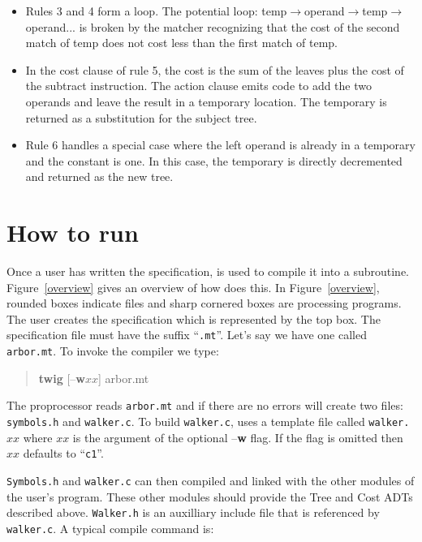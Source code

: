 \begin{itemize}
\item Rules 3 and 4 form a loop.
The potential loop: temp$\to$operand$\to$temp$\to$operand$...$ is
broken
by the matcher recognizing that the cost of the second match of temp
does not cost less than the first match of temp.

\item In the cost clause of rule 5, the cost is the sum of the
leaves plus the cost of the subtract instruction.
The action clause emits code to add the two operands
and leave the result in a temporary location.  The temporary is
returned as a substitution for the subject tree.

\item Rule 6 handles a special case where the left operand is
already in a temporary and the constant is one.  In this case, the
temporary is directly decremented and returned as the new tree.
\end{itemize}

\section{How to run \Twigcomp{}}

Once a user has written the specification, \twigcomp{} is used to compile it
into a subroutine.
Figure~\ref{overview} gives an overview of how \twigcomp{} does this.
In Figure~\ref{overview}, rounded boxes indicate files and sharp
cornered boxes
are processing programs.  The user creates the \twiglang{} specification which
is represented by the top box.  The specification file must have the
suffix ``{\tt .mt}''.  Let's say we have one called {\tt arbor.mt}.
To invoke the \twigcomp{} compiler we type:

\begin{verse}
{\bf twig} [--{\bf w$xx$}] arbor.mt
\end{verse}

The proprocessor reads {\tt arbor.mt} and if there are no errors
will create two files: {\tt symbols.h} and {\tt walker.c}.
To build {\tt walker.c}, \twigcomp{} uses a template file called {\tt walker.$xx$}
where $xx$ is the argument of the optional --{\bf w} flag.
If the flag is omitted then $xx$ defaults to ``{\tt c1}''.

{\tt Symbols.h} and {\tt walker.c}
can then compiled and linked with the other modules of the
user's program.  These other modules should provide the
Tree and Cost ADTs described above.
{\tt Walker.h} is an auxilliary include file that is referenced by {
\tt walker.c}.
A typical compile command is:

